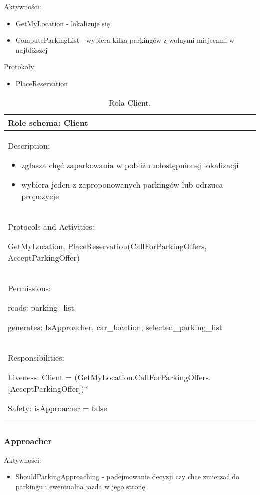 Aktywności:
\begin{itemize}
    \item GetMyLocation - lokalizuje się
    \item ComputeParkingList - wybiera kilka parkingów z wolnymi miejscami w najbliższej

\end{itemize}

Protokoły:
\begin{itemize}
    \item PlaceReservation
\end{itemize}


\begin{table}[!h] \label{tab:rola1} \centering
    \caption{Rola Client.}
    \begin{tabular} {| p{14cm} |} \hline
        Role schema: Client \\ \hline
        Description:

        \begin{itemize}
            \item zgłasza chęć zaparkowania w pobliżu udostępnionej lokalizacji
            \item wybiera jeden z zaproponowanych parkingów lub odrzuca propozycje
            
        \end{itemize} \\ \hline
        Protocols and Activities: 
        
        \ul{GetMyLocation}, PlaceReservation(CallForParkingOffers, AcceptParkingOffer) \\ \hline
        Permissions:

        reads: parking\_list

        generates:  IsApproacher, car\_location, selected\_parking\_list \\ \hline
        Responsibilities:

        Liveness: Client = (GetMyLocation.CallForParkingOffers.[AcceptParkingOffer])*


        Safety: isApproacher = false \\ \hline
    \end{tabular}
\end{table}

\newpage
\subsubsection{Approacher}

Aktywności: 
\begin{itemize}
    \item ShouldParkingApproaching - podejmowanie decyzji czy chce zmierzać do parkingu i ewentualna jazda w jego stronę
\end{itemize}

